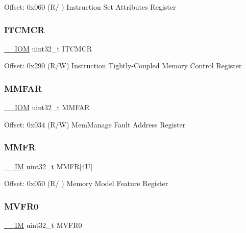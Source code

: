 Offset\+: 0x060 (R/ ) Instruction Set Attributes Register \mbox{\label{struct_s_c_b___type_a18d1734811b40e7edf6e5213bf336ca8}} 
\subsubsection{\texorpdfstring{I\+T\+C\+M\+CR}{ITCMCR}}
{\footnotesize\ttfamily \mbox{\hyperlink{core__cm4_8h_ab6caba5853a60a17e8e04499b52bf691}{\+\_\+\+\_\+\+I\+OM}} uint32\+\_\+t I\+T\+C\+M\+CR}

Offset\+: 0x290 (R/W) Instruction Tightly-\/\+Coupled Memory Control Register \mbox{\label{struct_s_c_b___type_ae9d94d186615d57d38c9253cb842d244}} 
\subsubsection{\texorpdfstring{M\+M\+F\+AR}{MMFAR}}
{\footnotesize\ttfamily \mbox{\hyperlink{core__cm4_8h_ab6caba5853a60a17e8e04499b52bf691}{\+\_\+\+\_\+\+I\+OM}} uint32\+\_\+t M\+M\+F\+AR}

Offset\+: 0x034 (R/W) Mem\+Manage Fault Address Register \mbox{\label{struct_s_c_b___type_ab6c914b579d22d7eb86d0e3d9a5fde71}} 
\subsubsection{\texorpdfstring{M\+M\+FR}{MMFR}}
{\footnotesize\ttfamily \mbox{\hyperlink{core__cm4_8h_a4cc1649793116d7c2d8afce7a4ffce43}{\+\_\+\+\_\+\+IM}} uint32\+\_\+t M\+M\+FR\mbox{[}4\+U\mbox{]}}

Offset\+: 0x050 (R/ ) Memory Model Feature Register \mbox{\label{struct_s_c_b___type_a9b0103b438c8922eaea5624f71afbbc8}} 
\subsubsection{\texorpdfstring{M\+V\+F\+R0}{MVFR0}}
{\footnotesize\ttfamily \mbox{\hyperlink{core__cm4_8h_a4cc1649793116d7c2d8afce7a4ffce43}{\+\_\+\+\_\+\+IM}} uint32\+\_\+t M\+V\+F\+R0}


